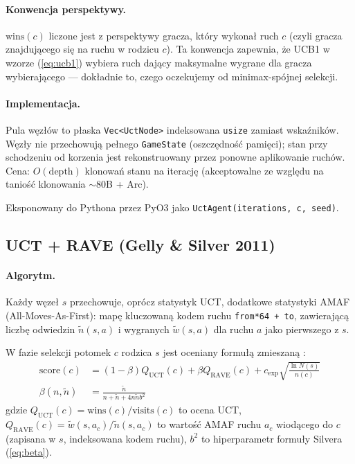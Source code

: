 \paragraph{Konwencja perspektywy.}
$\text{wins}(c)$ liczone jest z perspektywy gracza, który wykonał ruch $c$
(czyli gracza znajdującego się na ruchu w rodzicu $c$). Ta konwencja
zapewnia, że UCB1 w wzorze (\ref{eq:ucb1}) wybiera ruch dający
maksymalne wygrane dla gracza wybierającego --- dokładnie to, czego oczekujemy
od minimax-spójnej selekcji.

\paragraph{Implementacja.}
Pula węzłów to płaska \texttt{Vec<UctNode>} indeksowana \texttt{usize}
zamiast wskaźników. Węzły nie przechowują pełnego \texttt{GameState} (oszczędność
pamięci); stan przy schodzeniu od korzenia jest rekonstruowany przez
ponowne aplikowanie ruchów. Cena: $O(\text{depth})$ klonowań stanu na
iterację (akceptowalne ze względu na taniość klonowania $\sim$80B + Arc).

Eksponowany do Pythona przez PyO3 jako \texttt{UctAgent(iterations, c, seed)}.

\subsection{UCT + RAVE (Gelly \& Silver 2011)}

\paragraph{Algorytm.}
Każdy węzeł $s$ przechowuje, oprócz statystyk UCT, dodatkowe statystyki AMAF
(All-Moves-As-First): mapę kluczowaną kodem ruchu \texttt{from*64 + to},
zawierającą liczbę odwiedzin $\tilde{n}(s, a)$ i wygranych $\tilde{w}(s, a)$
dla ruchu $a$ jako pierwszego z $s$.

W fazie selekcji potomek $c$ rodzica $s$ jest oceniany formułą zmieszaną
\cite{gelly2011monte}:
\begin{align}
    \text{score}(c) &= (1 - \beta) Q_{\text{UCT}}(c) + \beta Q_{\text{RAVE}}(c) + c_{\text{exp}} \sqrt{\frac{\ln N(s)}{n(c)}} \label{eq:rave}\\
    \beta(n, \tilde{n}) &= \frac{\tilde{n}}{n + \tilde{n} + 4 n \tilde{n} b^2} \label{eq:beta}
\end{align}
gdzie $Q_{\text{UCT}}(c) = \text{wins}(c) / \text{visits}(c)$ to ocena UCT,
$Q_{\text{RAVE}}(c) = \tilde{w}(s, a_c) / \tilde{n}(s, a_c)$ to wartość AMAF
ruchu $a_c$ wiodącego do $c$ (zapisana w $s$, indeksowana kodem ruchu),
$b^2$ to hiperparametr formuły Silvera (\ref{eq:beta}).

